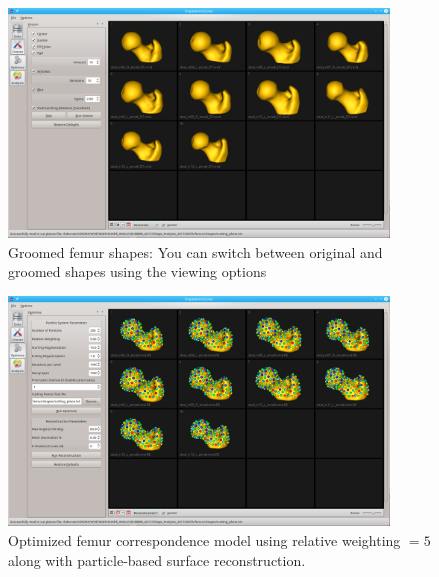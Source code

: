 \documentclass[letterpaper,12pt]{article}   %
\begin{document}
\begin{figure}[!htp]
	\centering
	\includegraphics[width=0.9\textwidth]{figs_v2/femur_groom.png}
	\caption{Groomed femur shapes: You can switch between original and groomed shapes using the viewing options}
	\label{fig:femur_groom}
\end{figure}

\begin{figure}[!htp]
	\centering
	\includegraphics[width=0.9\textwidth]{figs_v2/femur_optimize_reconstructed.png}
	\caption{Optimized femur correspondence model using relative weighting $ = 5$ along with particle-based surface reconstruction.}
	\label{fig:femur_optimize_reconstructed}
\end{figure}
\end{document}
